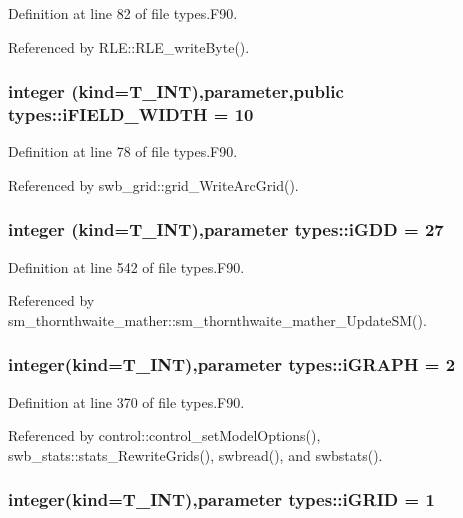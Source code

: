 Definition at line 82 of file types.F90.



Referenced by RLE::RLE\_\-writeByte().

\hypertarget{namespacetypes_ac00fb4e6602e3f1826af08a6bd5bc4e7}{
\subsubsection[{iFIELD\_\-WIDTH}]{\setlength{\rightskip}{0pt plus 5cm}integer (kind={\bf T\_\-INT}),parameter,public {\bf types::iFIELD\_\-WIDTH} = 10}}
\label{namespacetypes_ac00fb4e6602e3f1826af08a6bd5bc4e7}


Definition at line 78 of file types.F90.



Referenced by swb\_\-grid::grid\_\-WriteArcGrid().

\hypertarget{namespacetypes_aefc79ccbcc184af0a988b134d416fb8d}{
\subsubsection[{iGDD}]{\setlength{\rightskip}{0pt plus 5cm}integer (kind={\bf T\_\-INT}),parameter {\bf types::iGDD} = 27}}
\label{namespacetypes_aefc79ccbcc184af0a988b134d416fb8d}


Definition at line 542 of file types.F90.



Referenced by sm\_\-thornthwaite\_\-mather::sm\_\-thornthwaite\_\-mather\_\-UpdateSM().

\hypertarget{namespacetypes_a94f1aafe474b6e3e8dc2782d3d84b55f}{
\subsubsection[{iGRAPH}]{\setlength{\rightskip}{0pt plus 5cm}integer(kind={\bf T\_\-INT}),parameter {\bf types::iGRAPH} = 2}}
\label{namespacetypes_a94f1aafe474b6e3e8dc2782d3d84b55f}


Definition at line 370 of file types.F90.



Referenced by control::control\_\-setModelOptions(), swb\_\-stats::stats\_\-RewriteGrids(), swbread(), and swbstats().

\hypertarget{namespacetypes_a187237a0372eaebca7e88b3c00e0c110}{
\subsubsection[{iGRID}]{\setlength{\rightskip}{0pt plus 5cm}integer(kind={\bf T\_\-INT}),parameter {\bf types::iGRID} = 1}}
\label{namespacetypes_a187237a0372eaebca7e88b3c00e0c110}


